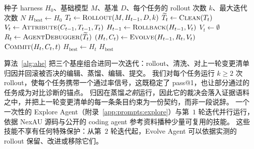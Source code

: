 \begin{algorithm}[htbp]
\caption{AHE 外层循环。}
\label{alg:ahe}
\begin{algorithmic}[1]
\Require 种子 harness $H_0$、基础模型 $M$、基准 $D$、每个任务的 rollout 次数 $k$、最大迭代次数 $N$
\State $H_{\text{best}} \gets H_0$
    \State $T_t \gets \textsc{Rollout}(M, H_{t-1}, D, k)$ 
    \State $\widetilde{T}_t \gets \textsc{Clean}(T_t)$ 
     
        \State $V_t \gets \textsc{Attribute}(C_{t-1}, T_{t-1}, T_t)$
        \State $H_{t-1} \gets \textsc{Rollback}(H_{t-1}, V_t)$
    \Else
        \State $V_t \gets \emptyset$
    \EndIf
    \State $R_t \gets \textsc{AgentDebugger}(\widetilde{T}_t)$ 
    \State $(H_t, C_t) \gets \textsc{Evolve}(H_{t-1}, R_t, V_t)$ 
    \State $\textsc{Commit}(H_t, C_t, t)$ 
     $H_{\text{best}} \gets H_t$ \EndIf
\EndFor
\State \Return $H_{\text{best}}$
\end{algorithmic}
\end{algorithm}

算法~\ref{alg:ahe} 把三个基座组合进同一次迭代：rollout、清洗、对上一轮变更清单归因并回滚被否决的编辑、蒸馏、编辑、提交。
我们对每个任务运行 $k\geq 2$ 次 rollout，使每个任务携带一个通过率信号，这既稳定了 pass@1，也让部分通过的任务成为对比诊断的锚点。
归因在蒸馏\emph{之前}运行，因此它的裁决会落入证据语料之中，并把上一轮变更清单的每一条条目约束为一份契约，而非一段说辞。
一个一次性的 Explore Agent（附录~\ref{app:prompts:explore}）与第~$1$ 轮迭代并行运行，依据 NexAU 源码与公开的 coding agent 参考资料播种少量可复用的技能。
这些技能不享有任何特殊保护：从第~$2$ 轮迭代起，Evolve Agent 可以依据实测的 rollout 保留、改进或移除它们。
